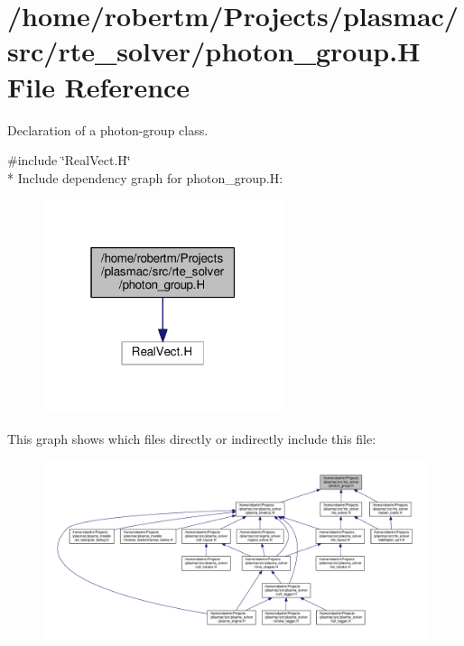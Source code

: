 \hypertarget{photon__group_8H}{}\section{/home/robertm/\+Projects/plasmac/src/rte\+\_\+solver/photon\+\_\+group.H File Reference}
\label{photon__group_8H}


Declaration of a photon-\/group class.  


{\ttfamily \#include \char`\"{}Real\+Vect.\+H\char`\"{}}\\*
Include dependency graph for photon\+\_\+group.\+H\+:\nopagebreak
\begin{figure}[H]
\begin{center}
\leavevmode
\includegraphics[width=199pt]{photon__group_8H__incl}
\end{center}
\end{figure}
This graph shows which files directly or indirectly include this file\+:\nopagebreak
\begin{figure}[H]
\begin{center}
\leavevmode
\includegraphics[width=350pt]{photon__group_8H__dep__incl}
\end{center}
\end{figure}
